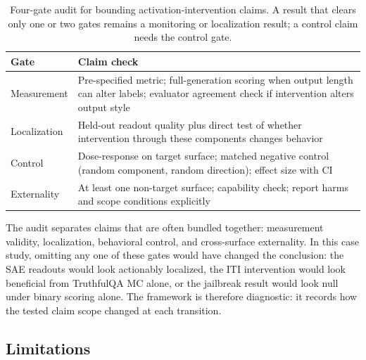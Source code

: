 \documentclass{article}
\begin{document}
\begin{table}[t]
\centering
\caption{Four-gate audit for bounding activation-intervention claims.
A result that clears only one or two gates remains a monitoring or localization result; a control claim needs the control gate.}
\label{tab:checklist}
\vskip 0.1in
\small
\begin{tabular}{@{}L{1.8cm}L{5.0cm}@{}}
\toprule
\textbf{Gate} & \textbf{Claim check} \\
\midrule
Measurement & Pre-specified metric; full-generation scoring when output length can alter labels; evaluator agreement check if intervention alters output style \\
\addlinespace
Localization & Held-out readout quality plus direct test of whether intervention through these components changes behavior \\
\addlinespace
Control & Dose-response on target surface; matched negative control (random component, random direction); effect size with CI \\
\addlinespace
Externality & At least one non-target surface; capability check; report harms and scope conditions explicitly \\
\bottomrule
\end{tabular}
\vskip -0.1in
\end{table}

The audit separates claims that are often bundled together: measurement validity, localization, behavioral control, and cross-surface externality.
In this case study, omitting any one of these gates would have changed the conclusion: the SAE readouts would look actionably localized, the ITI intervention would look beneficial from TruthfulQA MC alone, or the jailbreak result would look null under binary scoring alone.
The framework is therefore diagnostic: it records how the tested claim scope changed at each transition.

\subsection{Limitations}
\end{document}
